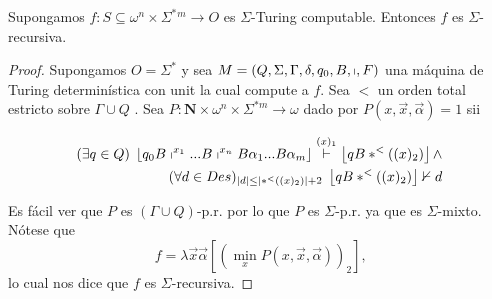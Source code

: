 	\begin{theorem}
		Supongamos $f:S\subseteq \omega ^{n}\times \Sigma ^{\ast }{}^{m}\rightarrow O $ es
    $\Sigma $-Turing computable. Entonces $f$ es $\Sigma $-recursiva.
	\begin{proof}
    Supongamos $O=\Sigma ^{\ast }$ y sea $M=\left( Q,\Sigma ,\Gamma ,\delta ,q_{0},B,\shortmid ,F\right) $
    una máquina de Turing determinística con unit la cual compute a $f$. Sea $< $ un orden total estricto sobre
    $\Gamma \cup Q$ . Sea $P:\mathbf{N}\times \omega ^{n}\times \Sigma ^{\ast m}\rightarrow \omega $ dado por
    $P(x,\vec{x},\vec{\alpha})=1$ sii

    \begin{eqnarray}
      \nonumber (\exists q\in Q)\;\left\lfloor q_{0}B\shortmid ^{x_{1}}...B\shortmid ^{x_{n}}B\alpha _{1}...B\alpha _{m}\right\rfloor \overset{(x)_{1}}{\vdash } \left\lfloor qB\ast ^{< }((x)_{2})\right\rfloor \wedge \\
      \nonumber (\forall d\in Des)_{\left\vert d\right\vert \leq \left\vert \ast ^{< }((x)_{2})\right\vert +2}\;\left\lfloor qB\ast ^{< }((x)_{2})\right\rfloor \nvdash d
    \end{eqnarray}

    Es fácil ver que $P$ es $(\Gamma \cup Q)$-p.r. por lo que $P$ es $ \Sigma $-p.r. ya que es $\Sigma $-mixto. Nótese que
    \[
      f=\lambda \vec{x}\vec{\alpha}\left[ \left( \min_{x}P(x,\vec{x},\vec{\alpha} )\right) _{2}\right] \text{,}
    \]
    lo cual nos dice que $f$ es $\Sigma $-recursiva.
	\end{proof}
  \end{theorem}

